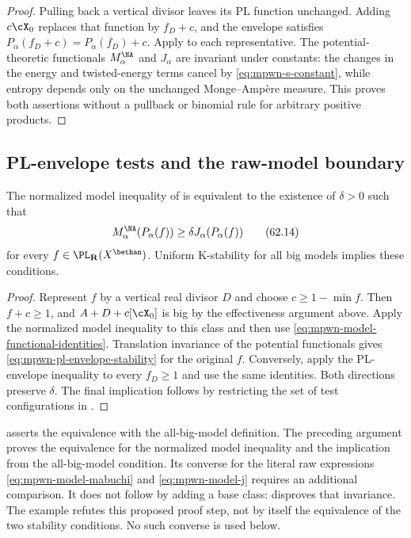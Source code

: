 \begin{proof}
Pulling back a vertical divisor leaves its PL function unchanged.
Adding $c\cX_0$ replaces that function by $f_D+c$, and the envelope
satisfies $P_\alpha(f_D+c)=P_\alpha(f_D)+c$.
Apply  to each representative.
The potential-theoretic functionals $M_\alpha^{\NA}$ and $J_\alpha$
are invariant under constants: the changes in the energy and
twisted-energy terms cancel by \eqref{eq:mpwn-s-constant},
while entropy depends only on the unchanged Monge--Amp\`ere measure.
This proves both assertions without a pullback or binomial rule
for arbitrary positive products.
\end{proof}

\subsection{PL-envelope tests and the raw-model boundary}
\label{subsec:mpwn-k-envelope-tests}

\begin{corollary}\label{cor:mpwn-model-stability-pl-envelopes}
The normalized model inequality of
 is equivalent to the existence of
$\delta>0$ such that
\[
 M_\alpha^{\NA}(P_\alpha(f))
       \geq\delta J_\alpha(P_\alpha(f))
\tag{62.14}\label{eq:mpwn-pl-envelope-stability}
\]
for every $f\in\PL_{\mathbf R}(X^{\bethan})$.
Uniform K-stability for all big models implies these conditions.
\end{corollary}

\begin{proof}
Represent $f$ by a vertical real divisor $D$ and choose
$c\geq1-\min f$.  Then $f+c\geq1$, and
$A+D+c[\cX_0]$ is big by the effectiveness argument above.
Apply the normalized model inequality to this class and then use
\eqref{eq:mpwn-model-functional-identities}.
Translation invariance of the potential functionals gives
\eqref{eq:mpwn-pl-envelope-stability} for the original $f$.
Conversely, apply the PL-envelope inequality to every $f_D\geq1$
and use the same identities.  Both directions preserve $\delta$.
The final implication follows by restricting the set of test
configurations in .
\end{proof}

\begin{remark}\label{rem:mpwn-unnormalized-model-boundary}
\cite[Corollary~9.1.6]{MPWN25} asserts the equivalence with the
all-big-model definition.  The preceding argument proves the
equivalence for the normalized model inequality and the implication
from the all-big-model condition.  Its converse for the literal
raw expressions \eqref{eq:mpwn-model-mabuchi} and
\eqref{eq:mpwn-model-j} requires an additional comparison.
It does not follow by adding a base class:
 disproves that invariance.
The example refutes this proposed proof step, not by itself the
equivalence of the two stability conditions.  No such converse is
used below.
\end{remark}

